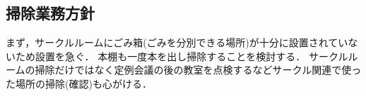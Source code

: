 \subsection*{掃除業務方針}


まず，サークルルームにごみ箱(ごみを分別できる場所)が十分に設置されていないため設置を急ぐ．
本棚も一度本を出し掃除することを検討する．
サークルルームの掃除だけではなく定例会議の後の教室を点検するなどサークル関連で使った場所の掃除(確認)も心がける．

